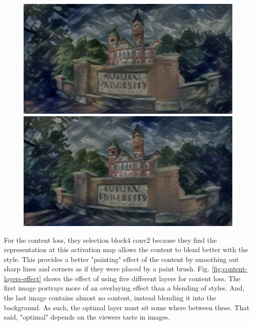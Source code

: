\documentclass{article}
\begin{document}
\begin{figure}[htp]
\medskip

    \begin{minipage}{0.3\linewidth}
    \includegraphics[width=\textwidth]{img/style-layer-selection/block4_conv1}
    \end{minipage}
    \begin{minipage}{0.3\linewidth}
    \includegraphics[width=\textwidth]{img/style-layer-selection/block5_conv1}
    \end{minipage}

\end{figure}

For the content loss, they selection block4 conv2 because they find the
representation at this activation map allows the content to blend better with
the style. This provides a better "painting" effect of the content by
smoothing out sharp lines and corners as if they were placed by a paint brush.
Fig. \ref{fig:content-layers-effect} shows the effect of using five different
layers for content loss. The first image portrays more of an overlaying effect
than a blending of styles. And, the last image contains almost no content,
instead blending it into the background. As such, the optimal layer must sit
some where between these. That said, "optimal" depends on the viewers taste in
images.
\end{document}

